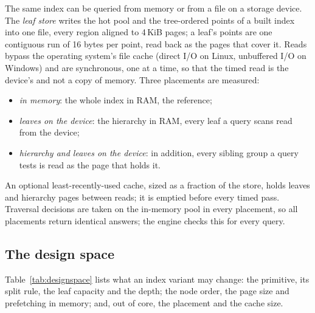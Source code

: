The same index can be queried from memory or from a file on a storage device. The \emph{leaf store} writes the hot pool and the tree-ordered points of a built index into one file, every region aligned to 4\,KiB pages; a leaf's points are one contiguous run of 16 bytes per point, read back as the pages that cover it. Reads bypass the operating system's file cache (direct I/O on Linux, unbuffered I/O on Windows) and are synchronous, one at a time, so that the timed read is the device's and not a copy of memory. Three placements are measured:
\begin{itemize}[leftmargin=*, itemsep=1pt]
\item \emph{in memory}: the whole index in RAM, the reference;
\item \emph{leaves on the device}: the hierarchy in RAM, every leaf a query scans read from the device;
\item \emph{hierarchy and leaves on the device}: in addition, every sibling group a query tests is read as the page that holds it.
\end{itemize}
An optional least-recently-used cache, sized as a fraction of the store, holds leaves and hierarchy pages between reads; it is emptied before every timed pass. Traversal decisions are taken on the in-memory pool in every placement, so all placements return identical answers; the engine checks this for every query.

\subsection{The design space}\label{sec:designspace}



Table~\ref{tab:designspace} lists what an index variant may change: the primitive, its split rule, the leaf capacity and the depth; the node order, the page size and prefetching in memory; and, out of core, the placement and the cache size.

